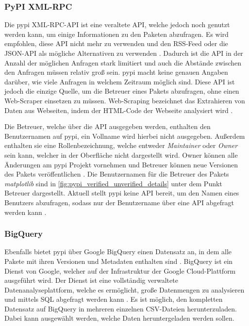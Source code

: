 \subsubsection*{PyPI XML-RPC}
\label{subsubsec:pypi_xml_rpc}
Die \gls{pypi} XML-RPC-API ist eine veraltete API, welche jedoch noch genutzt werden kann, um einige Informationen zu den Paketen abzufragen.
Es wird empfohlen, diese API nicht mehr zu verwenden und den RSS-Feed oder die JSON-API als mögliche Alternativen zu verwenden \autocite{python_software_foundation_warehouse_2024}.
Dadurch ist die API in der Anzahl der möglichen Anfragen stark limitiert und auch die Abstände zwischen den Anfragen müssen relativ groß sein.
\gls{pypi} macht keine genauen Angaben darüber, wie viele Anfragen in welchem Zeitraum möglich sind.
Diese API ist jedoch die einzige Quelle, um die Betreuer eines Pakets abzufragen, ohne einen Web-Scraper einsetzen zu müssen.
Web-Scraping bezeichnet das Extrahieren von Daten aus Webseiten, indem der HTML-Code der Webseite analysiert wird \autocite{richardson_beautifulsoup4_2024}.

Die Betreuer, welche über die API ausgegeben werden, enthalten den Benutzernamen auf \gls{pypi}, ein Vollname wird hierbei nicht ausgegeben.
Außerdem enthalten sie eine Rollenbezeichnung, welche entweder \emph{Maintainer} oder \emph{Owner} sein kann, welcher in der Oberfläche nicht dargestellt wird.
Owner können alle Änderungen am \gls{pypi} Projekt vornehmen und Betreuer können neue Versionen des Pakets veröffentlichen \autocite{ingram_deprecate_2023}.
Die Benutzernamen für die Betreuer des Pakets \emph{matplotlib} sind in \autoref{fig:pypi_verified_unverified_details} unter dem Punkt \glqq Betreuer\grqq{} dargestellt.
Aktuell stellt \gls{pypi} keine API bereit, um den Namen eines Benutzers abzufragen, sodass nur der Benutzername über eine API abgefragt werden kann \autocite{python_software_foundation_add_2024}.

\subsubsection*{BigQuery}
\label{subsubsec:pypi_bigquery}
Ebenfalls bietet \gls{pypi} über Google BigQuery einen Datensatz an, in dem alle Pakete mit ihren Versionen und Metadaten enthalten sind \autocite{python_software_foundation_warehouse_2024}.
BigQuery ist ein Dienst von Google, welcher auf der Infrastruktur der Google Cloud-Plattform ausgeführt wird.
Der Dienst ist eine vollständig verwaltete Datenanalyseplattform, welche es ermöglicht, große Datenmengen zu analysieren und mittels SQL abgefragt werden kann \autocite{google_bigquery_2024}.
Es ist möglich, den kompletten Datensatz auf BigQuery in mehreren einzelnen CSV-Dateien herunterzuladen.
Dabei kann ausgewählt werden, welche Daten heruntergeladen werden sollen.


